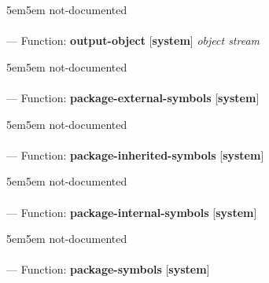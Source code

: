 \begin{adjustwidth}{5em}{5em}
not-documented
\end{adjustwidth}

\paragraph{}
\label{SYSTEM:OUTPUT-OBJECT}
--- Function: \textbf{output-object} [\textbf{system}] \textit{object stream}

\begin{adjustwidth}{5em}{5em}
not-documented
\end{adjustwidth}

\paragraph{}
\label{SYSTEM:PACKAGE-EXTERNAL-SYMBOLS}
--- Function: \textbf{package-external-symbols} [\textbf{system}] \textit{}

\begin{adjustwidth}{5em}{5em}
not-documented
\end{adjustwidth}

\paragraph{}
\label{SYSTEM:PACKAGE-INHERITED-SYMBOLS}
--- Function: \textbf{package-inherited-symbols} [\textbf{system}] \textit{}

\begin{adjustwidth}{5em}{5em}
not-documented
\end{adjustwidth}

\paragraph{}
\label{SYSTEM:PACKAGE-INTERNAL-SYMBOLS}
--- Function: \textbf{package-internal-symbols} [\textbf{system}] \textit{}

\begin{adjustwidth}{5em}{5em}
not-documented
\end{adjustwidth}

\paragraph{}
\label{SYSTEM:PACKAGE-SYMBOLS}
--- Function: \textbf{package-symbols} [\textbf{system}] \textit{}

